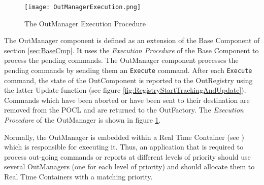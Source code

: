 \begin{figure}[h]
 \centering
 \texttt{[image: OutManagerExecution.png]}
 \caption{The OutManager Execution Procedure}
 \label{fig:OutManagerExecution}
\end{figure}

The OutManager component is defined as an extension of the Base Component of section \ref{sec:BaseCmp}. It uses the \textit{Execution Procedure} of the Base Component to process the pending commands. The OutManager component processes the pending commands by sending them an \texttt{Execute} command. After each \texttt{Execute} command, the state of the OutComponent is reported to the OutRegistry using the latter Update function (see figure \ref{fig:RegistryStartTrackingAndUpdate}). Commands which have been aborted or have been sent to their destination are removed from the POCL and are returned to the OutFactory. The \textit{Execution Procedure} of the OutManager is shown in figure \ref{fig:OutManagerExecution}.

Normally, the OutManager is embedded within a Real Time Container (see \cite{ref:fwprofile}) which is responsible for executing it. Thus, an application that is required to process out-going commands or reports at different levels of priority should use several OutManagers (one for each level of priority) and should allocate them to Real Time Containers with a matching priority.


